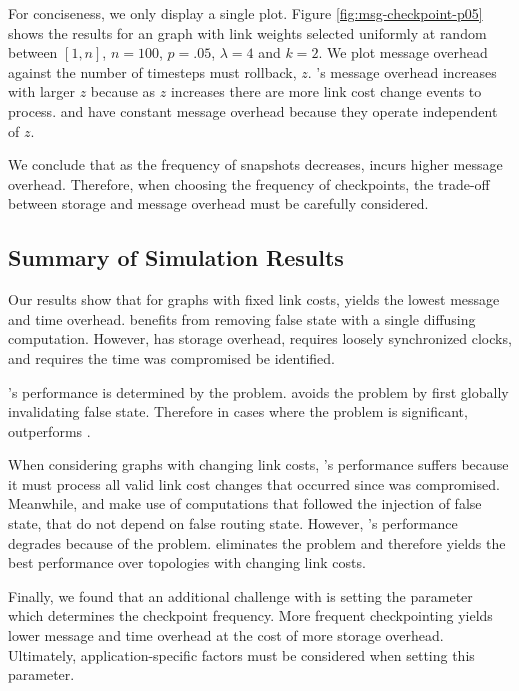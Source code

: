 For conciseness, we only display a single plot.  Figure \ref{fig:msg-checkpoint-p05} shows the results for an \er graph with link weights selected
uniformly at random between $[1,n]$,
$n=100$, $p=.05$, $\lambda=4$ and $k=2$. We plot message overhead against the number of timesteps \cpr must rollback, $z$. \cprs's message overhead increases with larger $z$ 
because as $z$ increases there are more link cost change events to process. \second and \purge have constant message overhead because they operate independent of $z$.

We conclude that as the frequency of \cpr snapshots decreases, \cpr incurs higher message overhead.  Therefore, when choosing the frequency of checkpoints,
the trade-off between storage and message overhead must be carefully considered. 








\subsection{Summary of Simulation Results}
\label{subsec:discuss}

Our results show that for graphs with fixed link costs, \cpr yields the lowest message and time overhead. \cpr benefits from removing false state with a single
diffusing computation. However, \cpr has storage overhead, requires loosely synchronized clocks, and requires the time \bad was compromised be identified.

\seconds's performance is determined by the \infinity problem. \purge avoids the \infinity problem by first globally invalidating false state.  Therefore in cases where the \infinity problem is 
significant, \purge outperforms \seconds.

When considering graphs with changing link costs, \cprs's performance suffers because it must process all valid link cost changes that occurred since \bad was compromised.
Meanwhile, \second and \purge make use of computations that followed the injection of false state, that do not depend on false routing state. However, \seconds's performance degrades 
because of the \infinity problem.  \purge eliminates the \infinity problem and therefore yields the best performance over topologies with changing link costs.

Finally, we found that an additional challenge with \cpr is setting the parameter which determines the checkpoint frequency.
More frequent checkpointing yields lower message and time overhead at the cost of more storage overhead. Ultimately, application-specific factors must be considered
when setting this parameter. 

